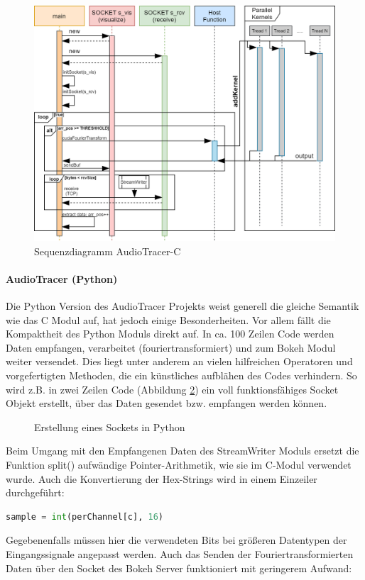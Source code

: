 \begin{figure}[hbt!]
	\centering      
	\includegraphics[scale=0.46, angle=-90]{figures/AudioTracerC++_sequence_diagram.png}
	\caption{Sequenzdiagramm AudioTracer-C}
	\label{fig:Seq_AudioTracer}
\end{figure}


\paragraph{AudioTracer (Python)}
Die Python Version des AudioTracer Projekts weist generell die gleiche Semantik wie das C Modul auf, hat jedoch einige Besonderheiten. Vor allem fällt die Kompaktheit des Python Moduls direkt auf. In ca. 100 Zeilen Code werden Daten empfangen, verarbeitet (fouriertransformiert) und zum Bokeh Modul weiter versendet. Dies liegt unter anderem an vielen hilfreichen Operatoren und vorgefertigten Methoden, die ein künstliches aufblähen des Codes verhindern. So wird z.B. in zwei Zeilen Code (Abbildung \ref{fig:pySocket}) ein voll funktionsfähiges Socket Objekt erstellt, über das Daten gesendet bzw. empfangen werden können. 

\begin{figure}[t!]
	
	\caption{Erstellung eines Sockets in Python}
	\label{fig:pySocket}
\end{figure}

Beim Umgang mit den Empfangenen Daten des StreamWriter Moduls ersetzt die Funktion split() aufwändige Pointer-Arithmetik, wie sie im C-Modul verwendet wurde. Auch die Konvertierung der Hex-Strings wird in einem Einzeiler durchgeführt:
\begin{lstlisting}[language=Python, frame=none]
	sample = int(perChannel[c], 16)
\end{lstlisting}
Gegebenenfalls müssen hier die verwendeten Bits bei größeren Datentypen der Eingangssignale angepasst werden. Auch das Senden der Fouriertransformierten Daten über den Socket des Bokeh Server funktioniert mit geringerem Aufwand:

